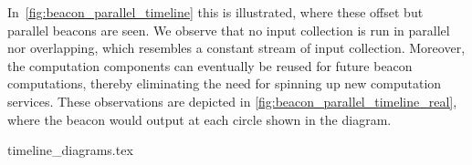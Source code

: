 In~\cref{fig:beacon_parallel_timeline} this is illustrated, where these offset but parallel beacons are seen.
We observe that no input collection is run in parallel nor overlapping, which resembles a constant stream of input collection.
Moreover, the computation components can eventually be reused for future beacon computations, thereby eliminating the need for spinning up new computation services.
These observations are depicted in \cref{fig:beacon_parallel_timeline_real}, where the beacon would output at each circle shown in the diagram.

{timeline_diagrams.tex}
